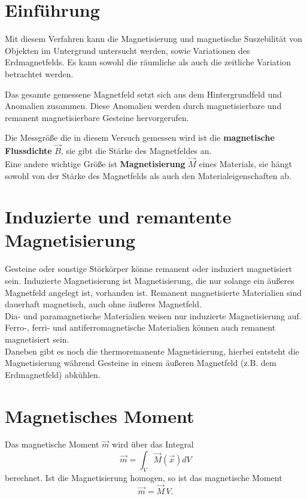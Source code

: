 \section{Einführung}

Mit diesem Verfahren kann die Magnetisierung und magnetische Suszebilität von Objekten im Untergrund untersucht werden, sowie Variationen des Erdmagnetfelds. Es kann sowohl die räumliche als auch die zeitliche Variation 
betrachtet werden.

Das gesamte gemessene Magnetfeld setzt sich aus dem Hintergrundfeld und Anomalien zusammen. Diese Anomalien 
 werden durch magnetisierbare und remanent magnetisierbare Gesteine hervorgerufen. 

Die Messgröße die in diesem Versuch gemessen wird ist die \textbf{magnetische Flussdichte} $\vec{B}$, sie gibt die Stärke des Magnetfeldes an. \\
Eine andere wichtige Größe ist \textbf{Magnetisierung} $\vec{M}$ eines Materials, sie hängt sowohl von der Stärke des Magnetfelds als auch den Materialeigenschaften ab.\\

\section{Induzierte und remantente Magnetisierung}
Gesteine oder sonstige Störkörper könne remanent oder induziert magnetisiert sein. Induzierte Magnetisierung ist Magnetisierung, die nur solange ein äußeres Magnetfeld angelegt ist, vorhanden ist. Remanent magnetisierte 
Materialien sind dauerhaft magnetisch, auch ohne äußeres Magnetfeld.\\
Dia- und paramagnetische Materialien weisen nur induzierte Magnetisierung auf. Ferro-, ferri- und antiferromagnetische Materialien können auch remanent magnetisiert sein. \\
Daneben gibt es noch die thermoremanente Magnetisierung, hierbei entsteht die Magnetisierung während Gesteine in einem äußeren Magnetfeld (z.B. dem Erdmagnetfeld) abkühlen.


\section{Magnetisches Moment}
Das magnetische Moment $\vec{m}$  wird über das Integral
\begin{equation}
\vec{m}  = \int_V \vec{M}(\vec{x}) dV
\end{equation}
berechnet.
Ist die Magnetisierung homogen, so ist das magnetische Moment
\begin{equation}
\vec{m}  = \vec{M} \,V.
\end{equation}

